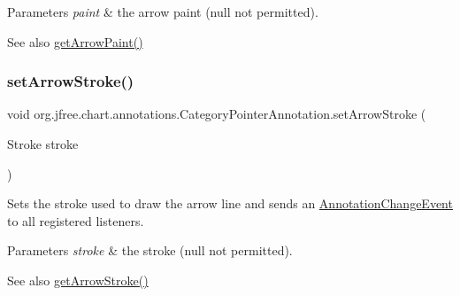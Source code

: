 \begin{DoxyParams}{Parameters}
{\em paint} & the arrow paint ({\ttfamily null} not permitted).\\
\hline
\end{DoxyParams}
\begin{DoxySeeAlso}{See also}
\mbox{\hyperlink{classorg_1_1jfree_1_1chart_1_1annotations_1_1_category_pointer_annotation_adb30b0bd8b349a9f501baddb97a02c03}{get\+Arrow\+Paint()}} 
\end{DoxySeeAlso}
\mbox{\label{classorg_1_1jfree_1_1chart_1_1annotations_1_1_category_pointer_annotation_a0cf30cc0bd8a1bc3cb086a1a03f4db70}} 
\subsubsection{\texorpdfstring{set\+Arrow\+Stroke()}{setArrowStroke()}}
{\footnotesize\ttfamily void org.\+jfree.\+chart.\+annotations.\+Category\+Pointer\+Annotation.\+set\+Arrow\+Stroke (\begin{DoxyParamCaption}\item[{Stroke}]{stroke }\end{DoxyParamCaption})}

Sets the stroke used to draw the arrow line and sends an \mbox{\hyperlink{}{Annotation\+Change\+Event}} to all registered listeners.


\begin{DoxyParams}{Parameters}
{\em stroke} & the stroke ({\ttfamily null} not permitted).\\
\hline
\end{DoxyParams}
\begin{DoxySeeAlso}{See also}
\mbox{\hyperlink{classorg_1_1jfree_1_1chart_1_1annotations_1_1_category_pointer_annotation_aee9f2db0519b9f8b02ec0d9c1f9abebf}{get\+Arrow\+Stroke()}} 
\end{DoxySeeAlso}
\mbox{\label{classorg_1_1jfree_1_1chart_1_1annotations_1_1_category_pointer_annotation_a8f025db11131888280f64eaf79315dbe}} 
